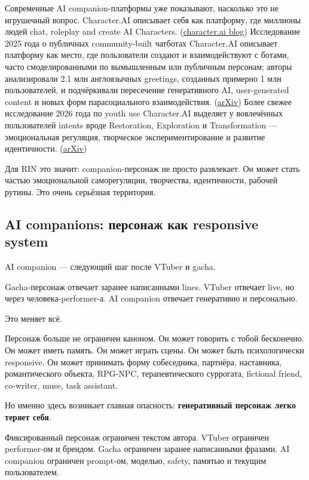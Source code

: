 Современные AI companion-платформы уже показывают, насколько это не
игрушечный вопрос. Character.AI описывает себя как платформу, где
миллионы людей chat, roleplay and create AI Characters.
(\href{https://blog.character.ai/?utm_source=chatgpt.com}{character.ai
blog}) Исследование 2025 года о публичных community-built чатботах
Character.AI описывает платформу как место, где пользователи создают и
взаимодействуют с ботами, часто смоделированными по вымышленным или
публичным персонам; авторы анализировали 2.1 млн англоязычных greetings,
созданных примерно 1 млн пользователей, и подчёркивали пересечение
генеративного AI, user-generated content и новых форм парасоциального
взаимодействия.
(\href{https://arxiv.org/abs/2505.13354?utm_source=chatgpt.com}{arXiv})
Более свежее исследование 2026 года по youth use Character.AI выделяет у
вовлечённых пользователей intents вроде Restoration, Exploration и
Transformation --- эмоциональная регуляция, творческое
экспериментирование и развитие идентичности.
(\href{https://arxiv.org/abs/2604.15340?utm_source=chatgpt.com}{arXiv})

Для RIN это значит: companion-персонаж не просто развлекает. Он может
стать частью эмоциональной саморегуляции, творчества, идентичности,
рабочей рутины. Это очень серьёзная территория.

\subsection*{AI companions: персонаж как responsive system}

AI companion --- следующий шаг после VTuber и gacha.

Gacha-персонаж отвечает заранее написанными lines. VTuber отвечает live,
но через человека-performer-а. AI companion отвечает генеративно и
персонально.

Это меняет всё.

Персонаж больше не ограничен каноном. Он может говорить с тобой
бесконечно. Он может иметь память. Он может играть сцены. Он может быть
психологически responsive. Он может принимать форму собеседника,
партнёра, наставника, романтического объекта, RPG-NPC, терапевтического
суррогата, fictional friend, co-writer, muse, task assistant.

Но именно здесь возникает главная опасность: \textbf{генеративный
персонаж легко теряет себя}.

Фиксированный персонаж ограничен текстом автора. VTuber ограничен
performer-ом и брендом. Gacha ограничен заранее написанными фразами. AI
companion ограничен prompt-ом, моделью, safety, памятью и текущим
пользователем.

